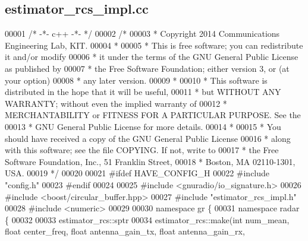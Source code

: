 \subsection{estimator\+\_\+rcs\+\_\+impl.\+cc}
\label{estimator__rcs__impl_8cc_source}

\begin{DoxyCode}
00001 \textcolor{comment}{/* -*- c++ -*- */}
00002 \textcolor{comment}{/* }
00003 \textcolor{comment}{ * Copyright 2014 Communications Engineering Lab, KIT.}
00004 \textcolor{comment}{ * }
00005 \textcolor{comment}{ * This is free software; you can redistribute it and/or modify}
00006 \textcolor{comment}{ * it under the terms of the GNU General Public License as published by}
00007 \textcolor{comment}{ * the Free Software Foundation; either version 3, or (at your option)}
00008 \textcolor{comment}{ * any later version.}
00009 \textcolor{comment}{ * }
00010 \textcolor{comment}{ * This software is distributed in the hope that it will be useful,}
00011 \textcolor{comment}{ * but WITHOUT ANY WARRANTY; without even the implied warranty of}
00012 \textcolor{comment}{ * MERCHANTABILITY or FITNESS FOR A PARTICULAR PURPOSE.  See the}
00013 \textcolor{comment}{ * GNU General Public License for more details.}
00014 \textcolor{comment}{ * }
00015 \textcolor{comment}{ * You should have received a copy of the GNU General Public License}
00016 \textcolor{comment}{ * along with this software; see the file COPYING.  If not, write to}
00017 \textcolor{comment}{ * the Free Software Foundation, Inc., 51 Franklin Street,}
00018 \textcolor{comment}{ * Boston, MA 02110-1301, USA.}
00019 \textcolor{comment}{ */}
00020 
00021 \textcolor{preprocessor}{#ifdef HAVE\_CONFIG\_H}
00022 \textcolor{preprocessor}{#include "config.h"}
00023 \textcolor{preprocessor}{#endif}
00024 
00025 \textcolor{preprocessor}{#include <gnuradio/io\_signature.h>}
00026 \textcolor{preprocessor}{#include <boost/circular\_buffer.hpp>}
00027 \textcolor{preprocessor}{#include "estimator_rcs_impl.h"}
00028 \textcolor{preprocessor}{#include <numeric>}
00029 
00030 \textcolor{keyword}{namespace }gr \{
00031   \textcolor{keyword}{namespace }radar \{
00032 
00033     estimator_rcs::sptr
00034     estimator_rcs::make(\textcolor{keywordtype}{int} num\_mean, \textcolor{keywordtype}{float} center_freq, \textcolor{keywordtype}{float} antenna\_gain\_tx, \textcolor{keywordtype}{float} antenna\_gain\_rx, \textcolor{keywordtype}{
}
\end{DoxyCode}
